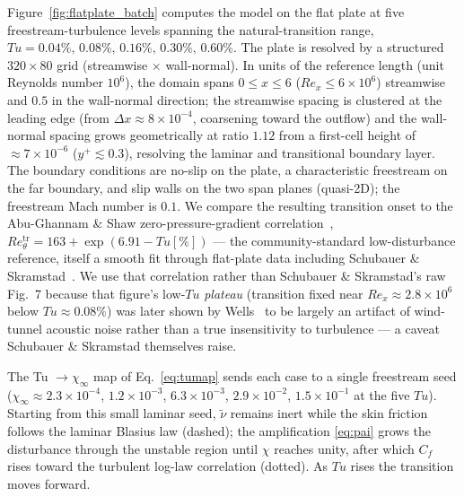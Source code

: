 \documentclass[journal]{new-aiaa}
\begin{document}
Figure~\ref{fig:flatplate_batch} computes the model on the flat plate at five
freestream-turbulence levels spanning the natural-transition
range, $Tu\!=\!0.04\%,\,0.08\%,\,0.16\%,\,0.30\%,\,0.60\%$. The plate is
resolved by a structured $320\!\times\!80$ grid (streamwise $\times$
wall-normal). In units of the reference length (unit Reynolds
number $10^6$), the domain spans $0\!\le\!x\!\le\!6$
($Re_x\!\le\!6\!\times\!10^6$) streamwise and $0.5$ in the wall-normal direction;
the streamwise spacing is clustered at the leading edge (from
$\Delta x\!\approx\!8\!\times\!10^{-4}$, coarsening toward the outflow) and the
wall-normal spacing grows geometrically at ratio $1.12$ from a first-cell height
of $\approx\!7\!\times\!10^{-6}$ ($y^+\!\lesssim\!0.3$), resolving the laminar and
transitional boundary layer. The boundary conditions are no-slip on the plate, a
characteristic freestream on the far boundary, and slip walls on the two span
planes (quasi-2D); the freestream Mach number is $0.1$. We compare the
resulting transition onset to the Abu-Ghannam \&
Shaw zero-pressure-gradient
correlation~\cite{abu_ghannam_shaw_1980}, $Re_\theta^\mathrm{tr}\!=\!163+\exp(6.91-Tu[\%])$ --- the
community-standard low-disturbance reference, itself a smooth fit through
flat-plate data including Schubauer \& Skramstad~\cite{schubauer_skramstad_1948}.
We use that correlation rather than Schubauer \& Skramstad's raw
Fig.~7 because that figure's low-$Tu$ \emph{plateau} (transition
fixed near $Re_x\!\approx\!2.8\!\times\!10^6$ below $Tu\!\approx\!0.08\%$) was
later shown by Wells~\cite{wells_1967} to be largely an artifact of
wind-tunnel acoustic noise rather than a true insensitivity to turbulence ---
a caveat Schubauer \& Skramstad themselves raise.

The Tu $\to\chi_\infty$ map of Eq.~\eqref{eq:tumap} sends each case to a single
freestream seed
($\chi_\infty\!\approx\!2.3\!\times\!10^{-4}$, $1.2\!\times\!10^{-3}$,
$6.3\!\times\!10^{-3}$, $2.9\!\times\!10^{-2}$, $1.5\!\times\!10^{-1}$ at the
five $Tu$). Starting from this small laminar seed, $\tilde\nu$ remains inert
while the skin friction follows the laminar Blasius law (dashed); the
amplification \eqref{eq:pai} grows the disturbance through the unstable region
until $\chi$ reaches unity, after which $C_f$ rises toward the turbulent
log-law correlation (dotted). As $Tu$ rises the transition moves
forward.
\end{document}
